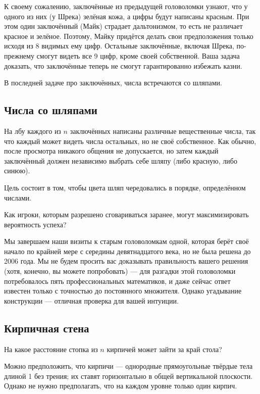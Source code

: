 К своему сожалению, заключённые из предыдущей головоломки узнают, что у одного из них (у Шрека) зелёная кожа,
а цифры будут написаны красным.
При этом один заключённый (Майк) страдает дальтонизмом, то есть не различает красное и зелёное.
Поэтому, Майку придётся делать свои предположения только исходя из 8 видимых ему цифр.
Остальные заключённые, включая Шрека, по-прежнему смогут видеть все 9 цифр, кроме своей собственной.
Ваша задача доказать, что заключённые теперь не смогут гарантированно избежать казни.

\medskip

В последней задаче про заключённых, числа встречаются со шляпами. 

\subsection*{Числа со шляпами}

На лбу каждого из $n$ заключённых написаны различные вещественные числа, так что каждый может видеть числа остальных, но не своё собственное.
Как обычно, после просмотра никакого общения не допускается, но затем каждый заключённый должен независимо выбрать себе шляпу (либо красную, либо синюю).

Цель состоит в том, чтобы цвета шляп чередовались в порядке, определённом числами.

Как игроки, которым разрешено сговариваться заранее, могут максимизировать вероятность успеха?

\medskip

Мы завершаем наши визиты к старым головоломкам одной, которая берёт своё начало по крайней мере с середины девятнадцатого века, но не была решена до 2006 года.
Мы не будем просить вас доказывать правильность вашего решения (хотя, конечно, вы можете попробовать) --- для разгадки этой головоломки потребовалось пять профессиональных математиков, и даже сейчас ответ известен только с точностью до постоянного множителя.
Однако угадывание конструкции --- отличная проверка для вашей интуиции.

\subsection*{Кирпичная стена}\label{Кирпичная стена}

На какое расстояние стопка из $n$ кирпичей может зайти за край стола?

 Можно предположить, что кирпичи --- однородные прямоугольные твёрдые тела длиной 1 без трения;
их ставят горизонтально в общей вертикальной плоскости.
Однако не нужно предполагать, что на каждом уровне только один кирпич.
